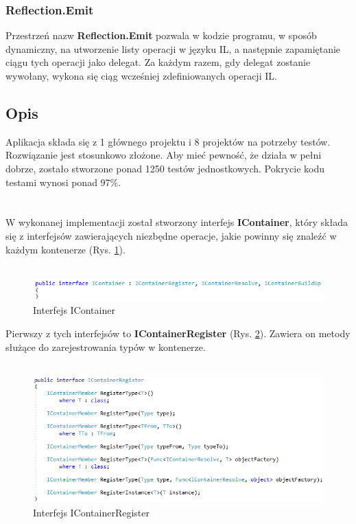 \documentclass[12pt]{article}
\begin{document}
\subsubsection{Reflection.Emit}
Przestrzeń nazw \textbf{Reflection.Emit} pozwala w kodzie programu, w sposób dynamiczny, na utworzenie listy operacji w języku IL, a następnie zapamiętanie ciągu tych operacji jako delegat. Za każdym razem, gdy delegat zostanie wywołany, wykona się ciąg wcześniej zdefiniowanych operacji IL.


\subsection{Opis}
Aplikacja składa się z 1 głównego projektu i 8 projektów na potrzeby testów. Rozwiązanie jest stosunkowo złożone. Aby mieć pewność, że działa w pełni dobrze, zostało stworzone ponad 1250 testów jednostkowych. Pokrycie kodu testami wynosi ponad 97\%.\\
\\
\\
W wykonanej implementacji został stworzony interfejs \textbf{IContainer}, który składa się z interfejsów zawierających niezbędne operacje, jakie powinny się znaleźć w każdym kontenerze (Rys. \ref{fig:IContainer}).\\ \\
\begin{figure}[H]
	\begin{center}
  		\includegraphics{IContainer.png}
  		\caption{Interfejs IContainer}
  		\label{fig:IContainer}
	\end{center}
\end{figure}
Pierwszy z tych interfejsów to \textbf{IContainerRegister} (Rys. \ref{fig:IContainerRegister}). Zawiera on metody służące do zarejestrowania typów w kontenerze.\\ \\
\begin{figure}[H]
	\begin{center}
  		\includegraphics{IContainerRegister.png}
  		\caption{Interfejs IContainerRegister}
  		\label{fig:IContainerRegister}
	\end{center}
\end{figure}
\end{document}
